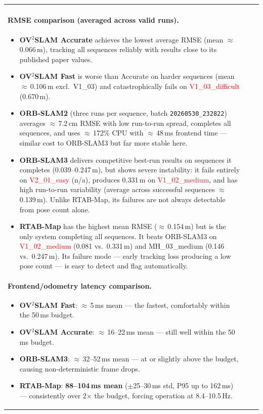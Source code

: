\documentclass[11pt]{article}
\begin{document}
\begin{table}[ht]
\begin{tabular}{p{3.2cm}p{5.2cm}p{5.2cm}}
\paragraph{RMSE comparison (averaged across valid runs).}
\begin{itemize}
    \item \textbf{OV$^2$SLAM Accurate} achieves the lowest average RMSE (mean $\approx$\,0.066\,m), tracking all sequences reliably with results close to its published paper values.
    \item \textbf{OV$^2$SLAM Fast} is worse than Accurate on harder sequences (mean $\approx$\,0.106\,m excl.\ V1\_03) and catastrophically fails on \textcolor{red}{V1\_03\_difficult} (0.670\,m).
    \item \textbf{ORB-SLAM2} (three runs per sequence, batch \texttt{20260530\_232822}) averages $\approx$\,7.2\,cm RMSE with low run-to-run spread, completes all sequences, and uses $\approx$\,172\% CPU with $\approx$\,48\,ms frontend time — similar cost to ORB-SLAM3 but far more stable here.
    \item \textbf{ORB-SLAM3} delivers competitive best-run results on sequences it completes (0.039--0.247\,m), but shows severe instability: it fails entirely on \textcolor{red}{V2\_01\_easy} (n/a), produces 0.331\,m on \textcolor{red}{V1\_02\_medium}, and has high run-to-run variability (average across successful sequences $\approx$\,0.139\,m). Unlike RTAB-Map, its failures are not always detectable from pose count alone.
    \item \textbf{RTAB-Map} has the highest mean RMSE ($\approx$\,0.154\,m) but is the only system completing all sequences. It beats ORB-SLAM3 on \textcolor{red}{V1\_02\_medium} (0.081 vs.\ 0.331\,m) and MH\_03\_medium (0.146 vs.\ 0.247\,m). Its failure mode — early tracking loss producing a low pose count — is easy to detect and flag automatically.
\end{itemize}

\paragraph{Frontend/odometry latency comparison.}
\begin{itemize}
    \item \textbf{OV$^2$SLAM Fast}: $\approx$\,5\,ms mean — the fastest, comfortably within the 50\,ms budget.
    \item \textbf{OV$^2$SLAM Accurate}: $\approx$\,16--22\,ms mean — still well within the 50\,ms budget.
    \item \textbf{ORB-SLAM3}: $\approx$\,32--52\,ms mean — at or slightly above the budget, causing non-deterministic frame drops.
    \item \textbf{RTAB-Map}: \textbf{88--104\,ms mean} ($\pm$25--30\,ms std, P95 up to 162\,ms) — consistently over 2$\times$ the budget, forcing operation at 8.4--10.5\,Hz.
\end{itemize}


\end{tabular}
\end{table}
\end{document}
